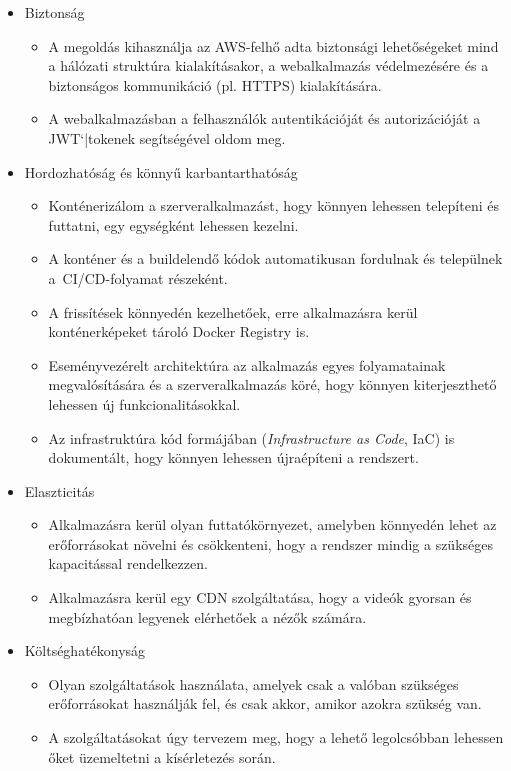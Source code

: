 \begin{itemize}
  \item Biztonság
  \begin{itemize}
    \item A megoldás kihasználja az AWS-felhő adta biztonsági lehetőségeket mind a hálózati struktúra kialakításakor, a webalkalmazás védelmezésére és a biztonságos kommunikáció (pl. HTTPS) kialakítására.
    \item A webalkalmazásban a felhasználók autentikációját és autorizációját a JWT`|tokenek segítségével oldom meg.
  \end{itemize}
  \item Hordozhatóság és könnyű karbantarthatóság
   \begin{itemize}
    \item Konténerizálom a szerveralkalmazást, hogy könnyen lehessen telepíteni és futtatni, egy egységként lehessen kezelni.
    \item A konténer és a buildelendő kódok automatikusan fordulnak és települnek a~CI/CD-folyamat részeként.
    \item A frissítések könnyedén kezelhetőek, erre alkalmazásra kerül konténerképeket tároló Docker Registry is.
    \item Eseményvezérelt architektúra az alkalmazás egyes folyamatainak megvalósítására és a szerveralkalmazás köré, hogy könnyen kiterjeszthető lehessen új funkcionalitásokkal.
    \item Az infrastruktúra kód formájában (\emph{Infrastructure as Code}\cite{iac}, IaC) is dokumentált, hogy könnyen lehessen újraépíteni a rendszert.
  \end{itemize}
  \item Elaszticitás
  \begin{itemize}
    \item Alkalmazásra kerül olyan futtatókörnyezet, amelyben könnyedén lehet az erőforrásokat növelni és csökkenteni, hogy a rendszer mindig a szükséges kapacitással rendelkezzen.
    \item Alkalmazásra kerül egy CDN szolgáltatása, hogy a videók gyorsan és megbízhatóan legyenek elérhetőek a nézők számára.
  \end{itemize}
  \item Költséghatékonyság
  \begin{itemize}
    \item Olyan szolgáltatások használata, amelyek csak a valóban szükséges erőforrásokat használják fel, és csak akkor, amikor azokra szükség van.
    \item A szolgáltatásokat úgy tervezem meg, hogy a lehető legolcsóbban lehessen őket üzemeltetni a kísérletezés során.
  \end{itemize}
\end{itemize}
